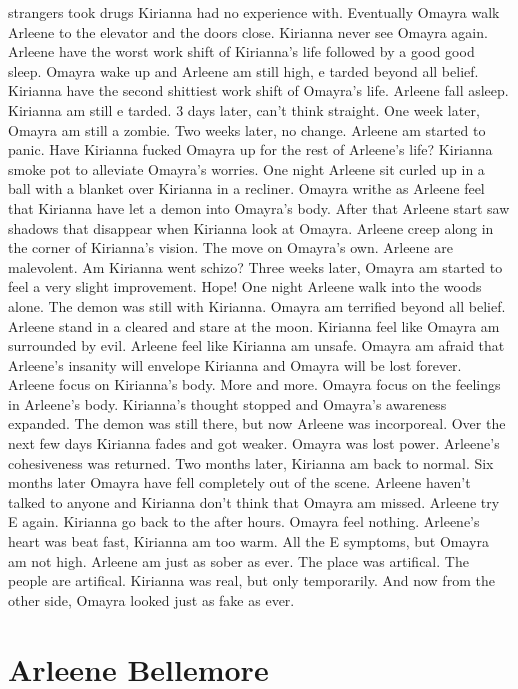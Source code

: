 \documentclass[12pt]{book}
\begin{document}
strangers took drugs Kirianna had no experience with. Eventually Omayra walk Arleene to the elevator and the doors close. Kirianna never see Omayra again. Arleene have the worst work shift of Kirianna's life followed by a good good sleep. Omayra wake up and Arleene am still high, e tarded beyond all belief. Kirianna have the second shittiest work shift of Omayra's life. Arleene fall asleep. Kirianna am still e tarded. 3 days later, can't think straight. One week later, Omayra am still a zombie. Two weeks later, no change. Arleene am started to panic. Have Kirianna fucked Omayra up for the rest of Arleene's life? Kirianna smoke pot to alleviate Omayra's worries. One night Arleene sit curled up in a ball with a blanket over Kirianna in a recliner. Omayra writhe as Arleene feel that Kirianna have let a demon into Omayra's body. After that Arleene start saw shadows that disappear when Kirianna look at Omayra. Arleene creep along in the corner of Kirianna's vision. The move on Omayra's own. Arleene are malevolent. Am Kirianna went schizo? Three weeks later, Omayra am started to feel a very slight improvement. Hope! One night Arleene walk into the woods alone. The demon was still with Kirianna. Omayra am terrified beyond all belief. Arleene stand in a cleared and stare at the moon. Kirianna feel like Omayra am surrounded by evil. Arleene feel like Kirianna am unsafe. Omayra am afraid that Arleene's insanity will envelope Kirianna and Omayra will be lost forever. Arleene focus on Kirianna's body. More and more. Omayra focus on the feelings in Arleene's body. Kirianna's thought stopped and Omayra's awareness expanded. The demon was still there, but now Arleene was incorporeal. Over the next few days Kirianna fades and got weaker. Omayra was lost power. Arleene's cohesiveness was returned. Two months later, Kirianna am back to normal. Six months later Omayra have fell completely out of the scene. Arleene haven't talked to anyone and Kirianna don't think that Omayra am missed. Arleene try E again. Kirianna go back to the after hours. Omayra feel nothing. Arleene's heart was beat fast, Kirianna am too warm. All the E symptoms, but Omayra am not high. Arleene am just as sober as ever. The place was artifical. The people are artifical. Kirianna was real, but only temporarily. And now from the other side, Omayra looked just as fake as ever.



\chapter{Arleene Bellemore}
\end{document}
